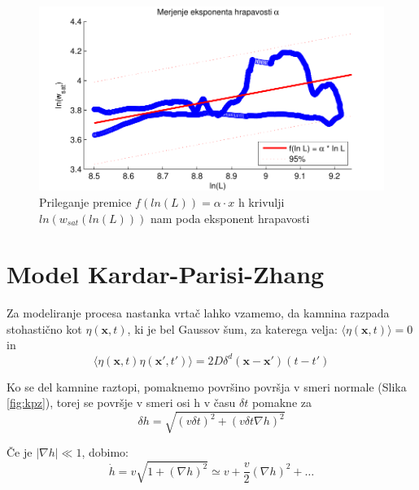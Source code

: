 \documentclass[a4paper, oneside, 12pt]{book}
\begin{document}
            \begin{figure}[H]
              \begin{center}
                \includegraphics{slike/menisija-alfa.pdf}
              \end{center}
              \caption{Prileganje premice $f(ln(L)) = \alpha \cdot x$ h krivulji $ln(w_{sat}(ln(L)))$ nam poda eksponent hrapavosti}
              \label{fig:menisija-alfa}
            \end{figure}


            \section{Model Kardar-Parisi-Zhang}

            Za modeliranje procesa nastanka vrtač lahko vzamemo, da kamnina razpada stohastično kot $\eta(\mathbf{x},t)$, ki je bel Gaussov šum, za katerega velja: $ \langle \eta(\mathbf{x},t) \rangle=0 $ in
        \begin{equation}
            \langle \eta(\mathbf{x},t) \eta(\mathbf{x'},t')\rangle = 2 D \delta^d(\mathbf{x}-\mathbf{x'})(t-t')
        \end{equation}

            Ko se del kamnine raztopi, pomaknemo površino površja v smeri normale (Slika \ref{fig:kpz}), torej se površje v smeri osi h v času $\delta t$ pomakne za 
        \begin{equation}
          \delta h = \sqrt{ (v \delta t)^2 + (v \delta t \nabla h)^2}
        \end{equation}

        Če je $|\nabla h| \ll 1$, dobimo: 
        \begin{equation}
            \dot h = v \sqrt{1 + (\nabla h)^2} \simeq v + \frac{v}{2} (\nabla h)^2 + \ldots
        \end{equation}
\end{document}
